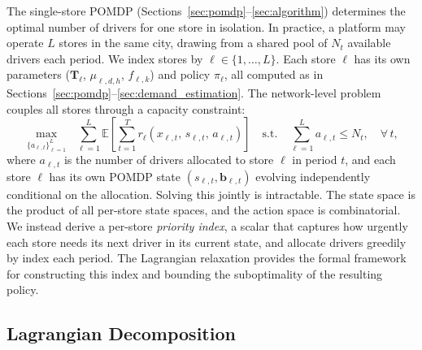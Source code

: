 \documentclass[preprint,11pt,authoryear]{elsarticle}
\newcommand{\bvec}[1]{\mathbf{#1}}
\theoremstyle{remark}
\begin{document}
The single-store POMDP (Sections~\ref{sec:pomdp}--\ref{sec:algorithm}) determines the optimal number of drivers for one store in isolation. In practice, a platform may operate $L$ stores in the same city, drawing from a shared pool of $N_t$ available drivers each period. We index stores by $\ell \in \{1, \ldots, L\}$. Each store $\ell$ has its own parameters ($\bvec{T}_\ell$, $\mu_{\ell,d,h}$, $f_{\ell,k}$) and policy $\pi_\ell$, all computed as in Sections~\ref{sec:pomdp}--\ref{sec:demand_estimation}. The network-level problem couples all stores through a capacity constraint:
\begin{equation}
    \max_{\{a_{\ell,t}\}_{\ell=1}^L} \;\; \sum_{\ell=1}^{L} \mathbb{E}\!\left[\sum_{t=1}^{T} r_\ell(x_{\ell,t},\, s_{\ell,t},\, a_{\ell,t})\right]
    \quad \text{s.t.} \quad \sum_{\ell=1}^{L} a_{\ell,t} \leq N_t, \quad \forall\, t,
    \label{eq:network_problem}
\end{equation}
where $a_{\ell,t}$ is the number of drivers allocated to store $\ell$ in period $t$, and each store $\ell$ has its own POMDP state $(s_{\ell,t}, \bvec{b}_{\ell,t})$ evolving independently conditional on the allocation. Solving this jointly is intractable. The state space is the product of all per-store state spaces, and the action space is combinatorial. We instead derive a per-store \emph{priority index}, a scalar that captures how urgently each store needs its next driver in its current state, and allocate drivers greedily by index each period. The Lagrangian relaxation provides the formal framework for constructing this index and bounding the suboptimality of the resulting policy.

\subsection{Lagrangian Decomposition}
\end{document}
